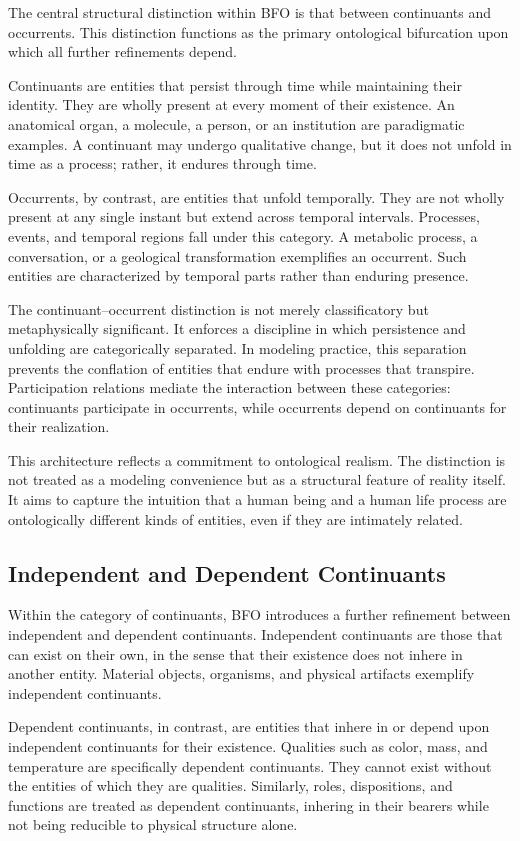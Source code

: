 \documentclass[12pt]{article}
\begin{document}
The central structural distinction within BFO is that between continuants and occurrents. This distinction functions as the primary ontological bifurcation upon which all further refinements depend.

Continuants are entities that persist through time while maintaining their identity. They are wholly present at every moment of their existence. An anatomical organ, a molecule, a person, or an institution are paradigmatic examples. A continuant may undergo qualitative change, but it does not unfold in time as a process; rather, it endures through time.

Occurrents, by contrast, are entities that unfold temporally. They are not wholly present at any single instant but extend across temporal intervals. Processes, events, and temporal regions fall under this category. A metabolic process, a conversation, or a geological transformation exemplifies an occurrent. Such entities are characterized by temporal parts rather than enduring presence.

The continuant–occurrent distinction is not merely classificatory but metaphysically significant. It enforces a discipline in which persistence and unfolding are categorically separated. In modeling practice, this separation prevents the conflation of entities that endure with processes that transpire. Participation relations mediate the interaction between these categories: continuants participate in occurrents, while occurrents depend on continuants for their realization.

This architecture reflects a commitment to ontological realism. The distinction is not treated as a modeling convenience but as a structural feature of reality itself. It aims to capture the intuition that a human being and a human life process are ontologically different kinds of entities, even if they are intimately related.

\subsection{Independent and Dependent Continuants}

Within the category of continuants, BFO introduces a further refinement between independent and dependent continuants. Independent continuants are those that can exist on their own, in the sense that their existence does not inhere in another entity. Material objects, organisms, and physical artifacts exemplify independent continuants.

Dependent continuants, in contrast, are entities that inhere in or depend upon independent continuants for their existence. Qualities such as color, mass, and temperature are specifically dependent continuants. They cannot exist without the entities of which they are qualities. Similarly, roles, dispositions, and functions are treated as dependent continuants, inhering in their bearers while not being reducible to physical structure alone.
\end{document}
